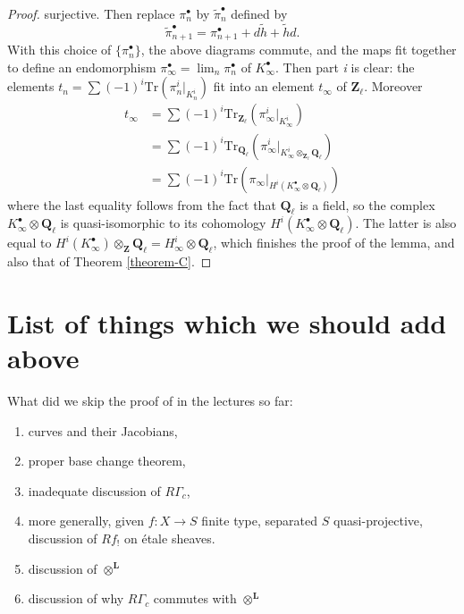 \begin{proof}
surjective. Then replace $\pi_n^\bullet$ by $\tilde\pi_n^\bullet$ defined by
$$
\tilde\pi_{n+1}^\bullet = \pi_{n+1}^\bullet + d\tilde h+\tilde hd.
$$
With this choice of $\{\pi_n^\bullet\}$, the above diagrams commute, and the
maps fit together to define an endomorphism $\pi_\infty^\bullet =
\lim_n\pi_n^\bullet$ of $K_\infty^\bullet$. Then part {\it i} is clear:
the elements $t_n = \sum(-1)^i \text{Tr}\left(\pi_n^i |_{K_n^i}\right)$
fit into an element $t_\infty$ of $\mathbf{Z}_\ell$. Moreover
\begin{align*}
t_\infty
& =
\sum (-1)^i \text{Tr}_{\mathbf{Z}_\ell}(\pi_\infty^i |_{K_\infty^i}) \\
& =
\sum (-1)^i \text{Tr}_{\mathbf{Q}_\ell}(
\pi_\infty^i |_{K_\infty^i \otimes_{\mathbf{Z}_\ell}\mathbf{Q}_\ell}) \\
& =
\sum (-1)^i \text{Tr}(
\pi_\infty |_{H^i(K_\infty^\bullet \otimes \mathbf{Q}_\ell)})
\end{align*}
where the last equality follows from the fact that $\mathbf{Q}_\ell$ is a
field, so the complex $K_\infty^\bullet \otimes \mathbf{Q}_\ell$ is
quasi-isomorphic to its cohomology
$H^i(K_\infty^\bullet \otimes \mathbf{Q}_\ell)$. The latter is also equal to
$H^i(K_\infty^\bullet)\otimes_{\mathbf{Z}}\mathbf{Q}_\ell = H_\infty^i \otimes
\mathbf{Q}_\ell$, which finishes the proof of the lemma, and also that of
Theorem \ref{theorem-C}.
\end{proof}




\section{List of things which we should add above}
\label{section-list-skipped}

\noindent
What did we skip the proof of in the lectures so far:
\begin{enumerate}
\item curves and their Jacobians,
\item proper base change theorem,
\item inadequate discussion of $R\Gamma_c$,
\item more generally, given $f : X \to S$ finite type,
separated $S$ quasi-projective, discussion of $Rf_!$ on \'etale sheaves.
\item discussion of $\otimes^{\mathbf{L}}$
\item discussion of why $R\Gamma_c$ commutes with $\otimes^{\mathbf{L}}$
\end{enumerate}






